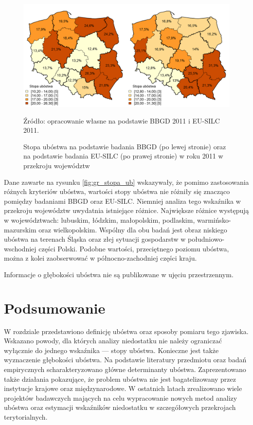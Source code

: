 \begin{figure}[ht]
\includegraphics[width=\textwidth]{01_wykresy/arpr_nts2_bbgd_silc_2011.png}
\caption{Stopa ubóstwa na podstawie badania BBGD (po lewej stronie) oraz na podstawie badania EU-SILC (po prawej stronie) w roku 2011 w przekroju województw}
\small{Źródło: opracowanie własne na podstawie BBGD 2011 i EU-SILC 2011.}
\label{fig:arpr_nts2_bbgd_silc_2011}
\end{figure}

Dane zawarte na rysunku \ref{fig:gr_stopa_ub} wskazywały, że pomimo zastosowania różnych kryteriów ubóstwa, wartości stopy ubóstwa nie różniły się znacząco pomiędzy badaniami BBGD oraz EU-SILC. Niemniej analiza tego wskaźnika w przekroju województw uwydatnia istniejące różnice. Największe różnice występują w województwach: lubuskim, łódzkim, małopolskim, podlaskim, warmińsko-mazurskim oraz wielkopolskim. Wspólny dla obu badań jest obraz niskiego ubóstwa na terenach Śląska oraz złej sytuacji gospodarstw w południowo-wschodniej części Polski. Podobne wartości, przeciętnego poziomu ubóstwa, można z kolei zaobserwować w północno-zachodniej części kraju.

Informacje o głębokości ubóstwa nie są publikowane w ujęciu przestrzennym.

\section{Podsumowanie}

W rozdziale przedstawiono definicję ubóstwa oraz sposoby pomiaru tego zjawiska. Wskazano powody, dla których analizy niedostatku nie należy ograniczać wyłącznie do jednego wskaźnika --- stopy ubóstwa. Konieczne jest także wyznaczenie głębokości ubóstwa. Na podstawie literatury przedmiotu oraz badań empirycznych scharakteryzowano główne determinanty ubóstwa. Zaprezentowano także działania pokazujące, że problem ubóstwa nie jest bagatelizowany przez instytucje krajowe oraz międzynarodowe. W ostatnich latach zrealizowano wiele projektów badawczych mających na celu wypracowanie nowych metod analizy ubóstwa oraz estymacji wskaźników niedostatku w szczegółowych przekrojach terytorialnych. 

